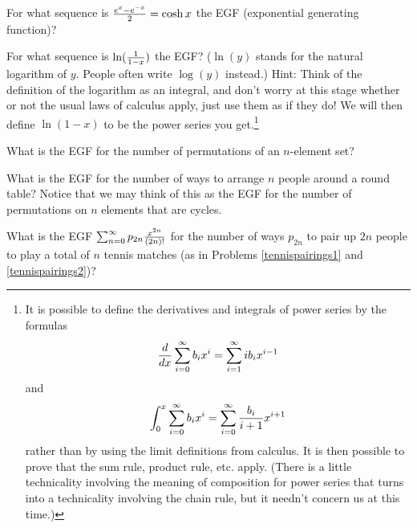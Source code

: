 \item For what sequence is ${e^x-e^{-x}\over 2} =\cosh x$ the EGF
(exponential generating function)?

\itemes For what sequence is $\ln({1\over 1-x})$ the EGF?
\label{ln1over1-x}($\ln (y)$ stands for the natural logarithm of $y$. 
People often write
$\log(y)$ instead.) Hint:  Think of the definition of the logarithm as an
integral, and don't worry at this stage whether or not the usual laws of
calculus apply, just use them as if they do!  We will then define
$\ln({ 1-x})$ to be the power series you
get.\label{naturallog}\footnote{It is possible to define the derivatives
and integrals of power series by the formulas
$${d\over dx}
\sum_{i=0}^\infty b_ix^i = \sum_{i=1}^\infty ib_ix^{i-1}$$ and $$\int_0^x
\sum_{i=0}^\infty b_ix^i = \sum_{i=0}^\infty {b_i\over i+1}x^{i+1}$$
rather than by using the limit definitions from calculus.  It is then
possible to prove that the sum rule, product rule, etc. apply.  (There is
a little technicality involving the meaning of composition for power
series that turns into a technicality involving the chain rule, but it
needn't concern us at this time.)}


\itemes What is the EGF for the number of
permutations of an $n$-element set?\label{exponentialpermutations}

\itemesi  What is the EGF for the number of ways
to arrange $n$ people around a round table?  Notice that we may think of
this as the EGF for the number of
permutations on $n$ elements that are cycles.\label{exponentialroundtable}

\itemesi What is the EGF $\sum_{n=0}^\infty
p_{2n}{x^{2n}\over (2n)!}$ for the number of ways $p_{2n}$ to pair up $2n$
people to play a total of
$n$ tennis matches (as in Problems
\ref{tennispairings1} and
\ref{tennispairings2})?\label{exponentialtennisparings}

